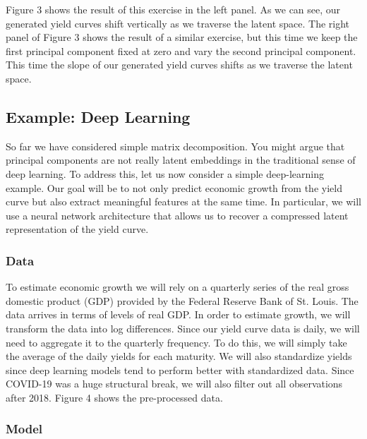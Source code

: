 \documentclass{article}
\theoremstyle{plain}
\theoremstyle{definition}
\theoremstyle{remark}
\begin{document}
Figure 3 shows the result of this exercise in the left panel. As we can see, our generated yield curves shift vertically as we traverse the latent space. The right panel of Figure 3 shows the result of a similar exercise, but this time we keep the first principal component fixed at zero and vary the second principal component. This time the slope of our generated yield curves shifts as we traverse the latent space.

\subsection{Example: Deep Learning}

So far we have considered simple matrix decomposition. You might argue that principal components are not really latent embeddings in the traditional sense of deep learning. To address this, let us now consider a simple deep-learning example. Our goal will be to not only predict economic growth from the yield curve but also extract meaningful features at the same time. In particular, we will use a neural network architecture that allows us to recover a compressed latent representation of the yield curve.

\subsubsection{Data}

To estimate economic growth we will rely on a quarterly series of the real gross domestic product (GDP) provided by the Federal Reserve Bank of St. Louis. The data arrives in terms of levels of real GDP. In order to estimate growth, we will transform the data into log differences. Since our yield curve data is daily, we will need to aggregate it to the quarterly frequency. To do this, we will simply take the average of the daily yields for each maturity. We will also standardize yields since deep learning models tend to perform better with standardized data. Since COVID-19 was a huge structural break, we will also filter out all observations after 2018. Figure 4 shows the pre-processed data.

\subsubsection{Model}
\end{document}

